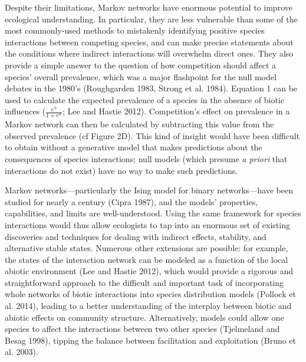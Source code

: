 \documentclass[12pt,]{article}
\begin{document}
\begin{spacing}{1.9}
\begin{flushleft}
Despite their limitations, Markov networks have enormous potential to
improve ecological understanding. In particular, they are less
vulnerable than some of the most commonly-used methods to mistakenly
identifying positive species interactions between competing species, and
can make precise statements about the conditions where indirect
interactions will overwhelm direct ones. They also provide a simple
answer to the question of how competition should affect a species'
overall prevalence, which was a major flashpoint for the null model
debates in the 1980's (Roughgarden 1983, Strong et al. 1984). Equation 1
can be used to calculate the expected prevalence of a species in the
absence of biotic influences (\(\frac{e^\alpha}{1 + e^{\alpha}}\); Lee
and Hastie 2012). Competition's effect on prevalence in a Markov network
can then be calculated by subtracting this value from the observed
prevalence (cf Figure 2D). This kind of insight would have been
difficult to obtain without a generative model that makes predictions
about the consequences of species interactions; null models (which
presume \emph{a priori} that interactions do not exist) have no way to
make such predictions.

Markov networks---particularly the Ising model for binary
networks---have been studied for nearly a century (Cipra 1987), and the
models' properties, capabilities, and limits are well-understood. Using
the same framework for species interactions would thus allow ecologists
to tap into an enormous set of existing discoveries and techniques for
dealing with indirect effects, stability, and alternative stable states.
Numerous other extensions are possible: for example, the states of the
interaction network can be modeled as a function of the local abiotic
environment (Lee and Hastie 2012), which would provide a rigorous and
straightforward approach to the difficult and important task of
incorporating whole networks of biotic interactions into species
distribution models (Pollock et al. 2014), leading to a better
understanding of the interplay between biotic and abiotic effects on
community structure. Alternatively, models could allow one species to
affect the interactions between two other species (Tjelmeland and Besag
1998), tipping the balance between facilitation and exploitation (Bruno
et al. 2003).


\end{flushleft}
\end{spacing}
\end{document}
